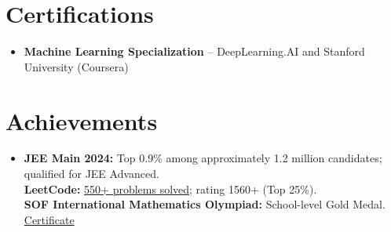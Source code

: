 \documentclass[letterpaper,10pt]{article}
\begin{document}
\section{Certifications}
\begin{itemize}[leftmargin=0.15in,label={},topsep=1pt,itemsep=1pt]
\small\item{\textbf{Machine Learning Specialization} -- DeepLearning.AI and Stanford University (Coursera)}
\end{itemize}
\vspace{-5pt}

\section{Achievements}
\begin{itemize}[leftmargin=0.15in,label={},topsep=1pt,itemsep=1pt]
\small\item{
  \textbf{JEE Main 2024:} Top 0.9\% among approximately 1.2 million candidates; qualified for JEE Advanced. \\
  \textbf{LeetCode:} \href{https://leetcode.com/u/guptaji2611/}{550+ problems solved}; rating 1560+ (Top 25\%). \\
  \textbf{SOF International Mathematics Olympiad:} School-level Gold Medal.
  \href{https://drive.google.com/file/d/1R3uK1vuTV5cOm1Q08Nf9VLYCNRTqqGld/view?pli=1}{Certificate}
}
\end{itemize}
\end{document}
